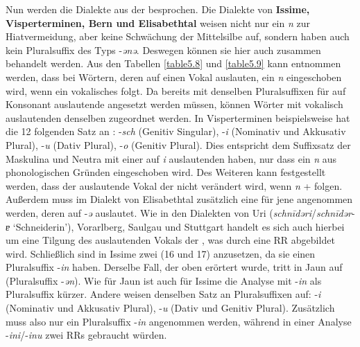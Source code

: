 Nun werden die Dialekte aus der  besprochen. Die Dialekte von \textbf{Issime, Visperterminen, Bern und Elisabethtal} weisen nicht nur ein \textit{n} zur Hiatvermeidung, aber keine Schwächung der Mittelsilbe auf, sondern haben auch kein Pluralsuffix des Typs -\textit{ənə}. Deswegen können sie hier auch zusammen behandelt werden. Aus den Tabellen \ref{table5.8} und \ref{table5.9} kann entnommen werden, dass bei Wörtern, deren  auf einen Vokal auslauten, ein \textit{n} eingeschoben wird, wenn ein vokalisches  folgt. Da bereits  mit denselben Pluralsuffixen für auf Konsonant auslautende  angesetzt werden müssen, können Wörter mit vokalisch auslautenden  denselben  zugeordnet werden. In Visperterminen beispielsweise hat die  12 folgenden Satz an : -\textit{sch} (Genitiv Singular), -\textit{i} (Nominativ und Akkusativ Plural), -\textit{u} (Dativ Plural), -\textit{o} (Genitiv Plural). Dies entspricht dem Suffixsatz der Maskulina und Neutra mit einer auf \textit{i} auslautenden  haben, nur dass ein \textit{n} aus phonologischen Gründen eingeschoben wird. Des Weiteren kann festgestellt werden, dass der auslautende Vokal der  nicht verändert wird, wenn \textit{n} +  folgen. Außerdem muss im Dialekt von Elisabethtal zusätzlich eine  für jene  angenommen werden, deren  auf -\textit{ə} auslautet. Wie in den Dialekten von Uri (\textit{schn\=idəri}/\textit{schn\=idər}-\textit{ɐ} ‘Schneiderin’), Vorarlberg, Saulgau und Stuttgart handelt es sich auch hierbei um eine Tilgung des auslautenden Vokals der , was durch eine RR abgebildet wird. Schließlich sind in Issime zwei  (16 und 17) anzusetzen, da sie einen Pluralsuffix -\textit{in} haben. Derselbe Fall, der oben erörtert wurde, tritt in Jaun auf (Pluralsuffix -\textit{ən}). Wie für Jaun ist auch für Issime die Analyse mit -\textit{in} als Pluralsuffix kürzer. Andere  weisen denselben Satz an Pluralsuffixen auf: -\textit{i} (Nominativ und Akkusativ Plural), -\textit{u} (Dativ und Genitiv Plural). Zusätzlich muss also nur ein Pluralsuffix -\textit{in} angenommen werden, während in einer Analyse -\textit{ini}/-\textit{inu} zwei RRs gebraucht würden.



